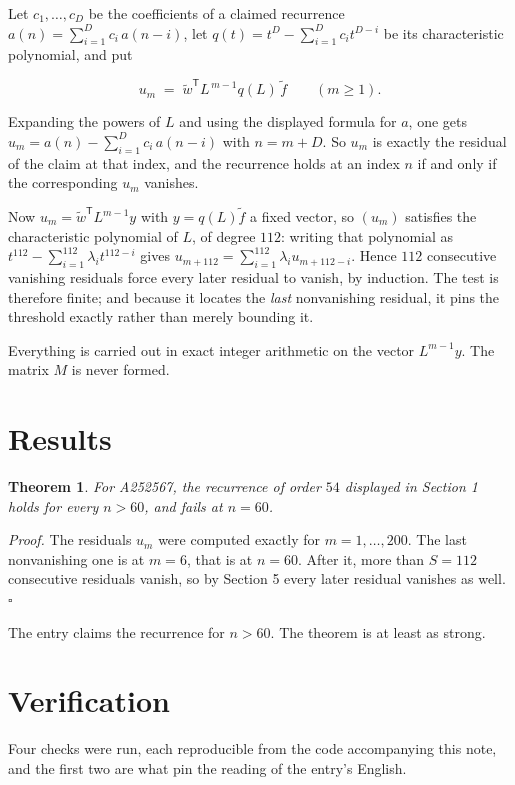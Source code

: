 \documentclass[11pt]{article}
\newtheorem{theorem}{Theorem}
\theoremstyle{definition}
\begin{document}
Let $c_1,\dots,c_D$ be the coefficients of a claimed recurrence $a(n) = \sum_{i=1}^{D} c_i\,a(n-i)$, let $q(t) = t^{D} - \sum_{i=1}^{D} c_i t^{D-i}$ be its characteristic polynomial, and put

\[u_m \;=\; \tilde w^{\mathsf T} L^{\,m-1} q(L)\,\tilde f \qquad (m \ge 1).\]

Expanding the powers of $L$ and using the displayed formula for $a$, one gets $u_m = a(n) - \sum_{i=1}^{D} c_i\,a(n-i)$ with $n = m + D$. So $u_m$ is exactly the residual of the claim at that index, and the recurrence holds at an index $n$ if and only if the corresponding $u_m$ vanishes.

Now $u_m = \tilde w^{\mathsf T} L^{m-1} y$ with $y = q(L)\tilde f$ a fixed vector, so $(u_m)$ satisfies the characteristic polynomial of $L$, of degree $112$: writing that polynomial as $t^{112} - \sum_{i=1}^{112} \lambda_i t^{112-i}$ gives $u_{m+112} = \sum_{i=1}^{112} \lambda_i u_{m+112-i}$. Hence $112$ consecutive vanishing residuals force every later residual to vanish, by induction. The test is therefore finite; and because it locates the {\itshape last} nonvanishing residual, it pins the threshold exactly rather than merely bounding it.

Everything is carried out in exact integer arithmetic on the vector $L^{m-1}y$. The matrix $M$ is never formed.

\section{Results}

\begin{theorem} For A252567, the recurrence of order $54$ displayed in Section 1 holds for every $n > 60$, and fails at $n = 60$.\end{theorem}

{\itshape Proof.} The residuals $u_m$ were computed exactly for $m = 1,\dots,200$. The last nonvanishing one is at $m = 6$, that is at $n = 60$. After it, more than $S = 112$ consecutive residuals vanish, so by Section 5 every later residual vanishes as well. $\square$

The entry claims the recurrence for $n > 60$. The theorem is at least as strong.

\section{Verification}

Four checks were run, each reproducible from the code accompanying this note, and the first two are what pin the reading of the entry's English.
\end{document}
